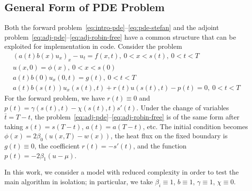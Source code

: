 \documentclass[letterpaper, 10pt, draft]{amsart}
\theoremstyle{definition}
\theoremstyle{remark}
\begin{document}
\subsection{General Form of PDE Problem}
Both the forward problem~\eqref{eq:intro-pde}--\eqref{eq:pde-stefan} and the
adjoint problem~\eqref{eq:adj-pde}--\eqref{eq:adj-robin-free} have a common
structure that can be exploited for implementation in code.
Consider the problem
\begin{gather}
  (a(t) b(x) u_x)_x  - u_t = f(x,t),~0<x<s(t),~0<t<T\label{eq:general-pde}
  \\
  u(x,0) = \phi(x),~0<x<s(0)\label{eq:general-init}
  \\
  a(t)b(0) u_x(0,t) = g(t),~0<t<T\label{eq:general-fixedbdy}
  \\
  a(t)b(s(t)) u_x(s(t),t) + r(t) u(s(t),t) - p(t)=0,~0<t<T\label{eq:general-movingbdy}
\end{gather}
For the forward problem, we have $r(t) \equiv 0$ and $p(t) = \gamma(s(t),t)-\chi(s(t),t)s'(t)$.
Under the change of variables $\bar{t} = T-t$, the
problem~\eqref{eq:adj-pde}--\eqref{eq:adj-robin-free} is of the same form after
taking $s(t) = s(T-t)$, $a(t)=a(T-t)$, etc.\@
The initial condition becomes $\phi(x)=2 \beta_0 (u(x,T) - w(x))$, the heat flux
on the fixed boundary is $g(t)\equiv 0$, the coefficient $r(t) = -s'(t)$, and
the function $p(t) = -2\beta_1 (u - \mu)$.

In this work, we consider a model with reduced complexity in order to test the
main algorithm in isolation; in particular, we take $\beta_i \equiv 1$, $b\equiv
1$, $\gamma \equiv 1$, $\chi \equiv 0$.
\end{document}
